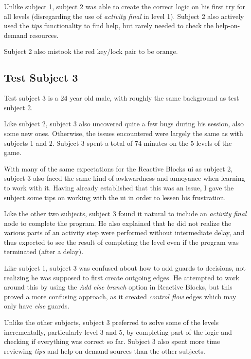 \noindent
Unlike subject 1, subject 2 was able to create the correct logic on his first try for all levels (disregarding the use of \emph{activity final} in level 1). Subject 2 also actively used the \emph{tips} functionality to find help, but rarely needed to check the help-on-demand resources.

\noindent
Subject 2 also mistook the red key/lock pair to be orange.

\subsection{Test Subject 3}
\label{sec:game_testing_subject3}
Test subject 3 is a 24 year old male, with roughly the same background as test subject 2.

\noindent
Like subject 2, subject 3 also uncovered quite a few bugs during his session, also some new ones. Otherwise, the issues encountered were largely the same as with subjects 1 and 2. Subject 3 spent a total of 74 minutes on the 5 levels of the game.

\noindent
With many of the same expectations for the Reactive Blocks \gls{ui} as subject 2, subject 3 also faced the same kind of awkwardness and annoyance when learning to work with it. Having already established that this was an issue, I gave the subject some tips on working with the \gls{ui} in order to lessen his frustration.

\noindent
Like the other two subjects, subject 3 found it natural to include an \emph{activity final} node to complete the program. He also explained that he did not realize the various parts of an activity step were performed without intermediate delay, and thus expected to see the result of completing the level even if the program was terminated (after a delay).

\noindent
Like subject 1, subject 3 was confused about how to add guards to decisions, not realizing he was supposed to first create outgoing edges. He attempted to work around this by using the \emph{Add else branch} option in Reactive Blocks, but this proved a more confusing approach, as it created \emph{control flow} edges which may only have \emph{else} guards.

\noindent
Unlike the other subjects, subject 3 preferred to solve some of the levels incrementally, particularly level 3 and 5, by completing part of the logic and checking if everything was correct so far. Subject 3 also spent more time reviewing \emph{tips} and help-on-demand sources than the other subjects. 

